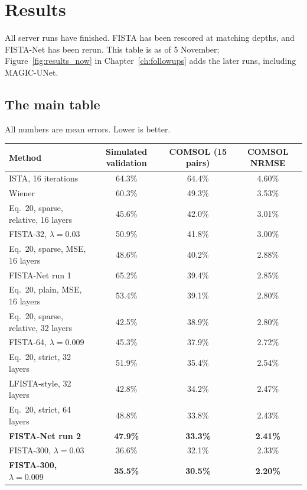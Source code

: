 \chapter{Results}\label{ch:results}

All server runs have finished. FISTA has been rescored at matching depths, and FISTA-Net has been rerun. This table is
as of 5 November; Figure~\ref{fig:results_now} in Chapter~\ref{ch:followups} adds the later runs, including MAGIC-UNet.

\section{The main table}

All numbers are mean errors. Lower is better.

\begin{center}
\small
\begin{tabular}{lccc}
\toprule
Method & Simulated validation & COMSOL (15 pairs) & COMSOL NRMSE \\
\midrule
ISTA, 16 iterations & 64.3\% & 64.4\% & 4.60\% \\
Wiener & 60.3\% & 49.3\% & 3.53\% \\
Eq.~20, sparse, relative, 16 layers & 45.6\% & 42.0\% & 3.01\% \\
FISTA-32, $\lambda=0.03$ & 50.9\% & 41.8\% & 3.00\% \\
Eq.~20, sparse, MSE, 16 layers & 48.6\% & 40.2\% & 2.88\% \\
FISTA-Net run 1 & 65.2\% & 39.4\% & 2.85\% \\
Eq.~20, plain, MSE, 16 layers & 53.4\% & 39.1\% & 2.80\% \\
Eq.~20, sparse, relative, 32 layers & 42.5\% & 38.9\% & 2.80\% \\
FISTA-64, $\lambda=0.009$ & 45.3\% & 37.9\% & 2.72\% \\
Eq.~20, strict, 32 layers & 51.9\% & 35.4\% & 2.54\% \\
LFISTA-style, 32 layers & 42.8\% & 34.2\% & 2.47\% \\
Eq.~20, strict, 64 layers & 48.8\% & 33.8\% & 2.43\% \\
\textbf{FISTA-Net run 2} & \textbf{47.9\%} & \textbf{33.3\%} & \textbf{2.41\%} \\
FISTA-300, $\lambda=0.03$ & 36.6\% & 32.1\% & 2.33\% \\
\textbf{FISTA-300, $\lambda=0.009$} & \textbf{35.5\%} & \textbf{30.5\%} & \textbf{2.20\%} \\
\bottomrule
\end{tabular}
\end{center}

